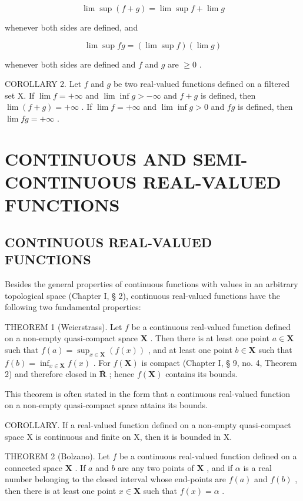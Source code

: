 \[
\lim \sup (f + g) = \lim \sup f + \lim g \tag {33}
\]

whenever both sides are defined, and

\[
\lim \sup f g = (\lim \sup f) (\lim g) \tag {34}
\]

whenever both sides are defined and \(f\) and \(g\) are \(\geqslant 0\) .

COROLLARY 2. Let \(f\) and \(g\) be two real-valued functions defined on a filtered set X. If \(\lim f = +\infty\) and \(\lim \inf g > -\infty\) and \(f + g\) is defined, then \(\lim (f + g) = +\infty\) . If \(\lim f = +\infty\) and \(\lim \inf g > 0\) and \(fg\) is defined, then \(\lim fg = +\infty\) .

\section{CONTINUOUS AND SEMI-CONTINUOUS REAL-VALUED FUNCTIONS}

\subsection{CONTINUOUS REAL-VALUED FUNCTIONS}

Besides the general properties of continuous functions with values in an arbitrary topological space (Chapter I, § 2), continuous real-valued functions have the following two fundamental properties:

THEOREM 1 (Weierstrass). Let \(f\) be a continuous real-valued function defined on a non-empty quasi-compact space \(\mathbf{X}\) . Then there is at least one point \(a \in \mathbf{X}\) such that \(f(a) = \sup_{x \in \mathbf{X}} (f(x))\) , and at least one point \(b \in \mathbf{X}\) such that \(f(b) = \inf_{x \in \mathbf{X}} f(x)\) . For \(f(\mathbf{X})\) is compact (Chapter I, § 9, no. 4, Theorem 2) and therefore closed in \(\overline{\mathbf{R}}\) ; hence \(f(\mathbf{X})\) contains its bounds.

This theorem is often stated in the form that a continuous real-valued function on a non-empty quasi-compact space attains its bounds.

COROLLARY. If a real-valued function defined on a non-empty quasi-compact space X is continuous and finite on X, then it is bounded in X.

THEOREM 2 (Bolzano). Let \(f\) be a continuous real-valued function defined on a connected space \(\mathbf{X}\) . If \(a\) and \(b\) are any two points of \(\mathbf{X}\) , and if \(\alpha\) is a real number belonging to the closed interval whose end-points are \(f(a)\) and \(f(b)\) , then there is at least one point \(x \in \mathbf{X}\) such that \(f(x) = \alpha\) .

